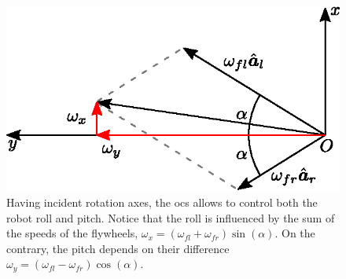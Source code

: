 \documentclass[letterpaper, 10 pt, conference]{ieeeconf}  %
\begin{document}
\begin{figure}
	\centering
	\includegraphics[width=.8\linewidth]{figures/sum_diff_mod.eps}
	\caption{\small Having incident rotation axes, the \gls{ocs} allows to control both the robot roll and pitch. Notice that the roll is influenced by the sum of the speeds of the flywheels, $\omega_x = \left(\omega_{fl} +  \omega_{fr}\right)\sin(\alpha)$. On the contrary, the pitch depends on their difference $\omega_y = \left(\omega_{fl} -  \omega_{fr}\right)\cos(\alpha)$.}
	\label{fig:sum-diff}
\end{figure}
\end{document}
